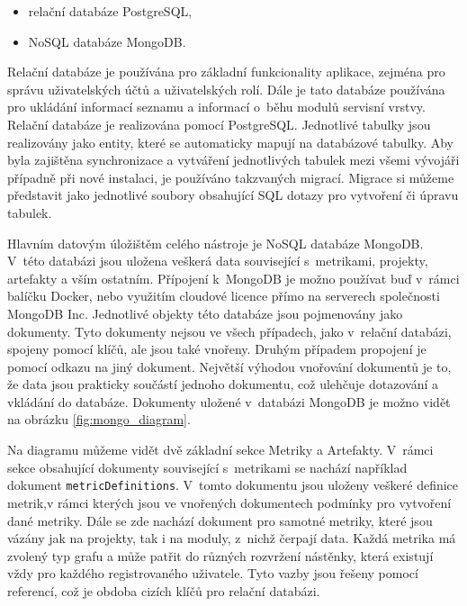 \documentclass[czech,master]{diploma}
\begin{document}
\begin{itemize}
\item relační databáze PostgreSQL,
\item NoSQL databáze MongoDB.
\end{itemize}

Relační databáze je používána pro základní funkcionality aplikace, zejména pro správu uživatelských účtů a uživatelských rolí. Dále je tato databáze používána pro ukládání informací seznamu a informací o~běhu modulů servisní vrstvy. Relační databáze je realizována pomocí PostgreSQL. Jednotlivé tabulky jsou realizovány jako entity, které se automaticky mapují na databázové tabulky. Aby byla zajištěna synchronizace a vytváření jednotlivých tabulek mezi všemi vývojáři případně při nové instalaci, je používáno takzvaných migrací. Migrace si můžeme představit jako jednotlivé soubory obsahující SQL dotazy pro vytvoření či úpravu tabulek.

Hlavním datovým úložištěm celého nástroje je NoSQL databáze MongoDB. V~této databázi jsou uložena veškerá data související s~metrikami, projekty, artefakty a vším ostatním. Přípojení k~MongoDB je možno používat buď v~rámci balíčku Docker, nebo využitím cloudové licence přímo na serverech společnosti MongoDB Inc. Jednotlivé objekty této databáze jsou pojmenovány jako dokumenty. Tyto dokumenty nejsou ve všech případech, jako v~relační databázi, spojeny pomocí klíčů, ale jsou také vnořeny. Druhým případem propojení je pomocí odkazu na jiný dokument. Největší výhodou vnořování dokumentů je to, že data jsou prakticky součástí jednoho dokumentu, což ulehčuje dotazování a vkládání do databáze. Dokumenty uložené v~databázi MongoDB je možno vidět na obrázku \ref{fig:mongo_diagram}.

Na diagramu můžeme vidět dvě základní sekce Metriky a Artefakty. V~rámci sekce obsahující dokumenty související s~metrikami se nachází například dokument \texttt{metricDefinitions}. V~tomto dokumentu jsou uloženy veškeré definice metrik,v rámci kterých jsou ve vnořených dokumentech podmínky pro vytvoření dané metriky. Dále se zde nachází dokument pro samotné metriky, které jsou vázány jak na projekty, tak i na moduly, z~nichž čerpají data. Každá metrika má zvolený typ grafu a může patřit do různých rozvržení nástěnky, která existují vždy pro každého registrovaného uživatele. Tyto vazby jsou řešeny pomocí  referencí, což je obdoba cizích klíčů pro relační databázi.
\end{document}
